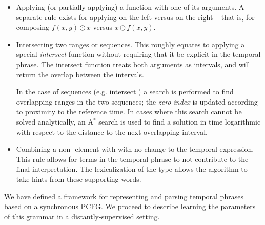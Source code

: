 \begin{itemize}
	\item Applying (or partially applying) a function with one of its
			arguments.
		A separate rule exists for applying on the left versus on the right --
		that is, for composing $f(x,y) \odot x$ versus $x \odot f(x,y)$.
	\item Intersecting two ranges or sequences.
		This roughly equates to applying a special \textit{intersect} function
			without requiring that it be explicit in the temporal phrase.
		The intersect function treats both arguments as intervals, and will return
			the overlap between the intervals.

		In the case of sequences (e.g.  intersect ) a
			search is performed to find overlapping ranges in the two sequences;
			the \textit{zero index} is updated according to proximity to the
			reference time.
		In cases where this search cannot be solved analytically, an A$^{*}$
			search is used to find a solution in time logarithmic with respect to
			the distance to the next overlapping interval.
	\item Combining a non- element with  with no change to the
			temporal expression.
		This rule allows for terms in the temporal phrase to not contribute 
			to the final interpretation.
			The lexicalization of the  type allows the algorithm
			to take hints from these supporting words.
\end{itemize}

We have defined a framework for representing and parsing temporal phrases
	based on a synchronous PCFG.
We proceed to describe learning the parameters of this grammar in a
	distantly-supervised setting.

